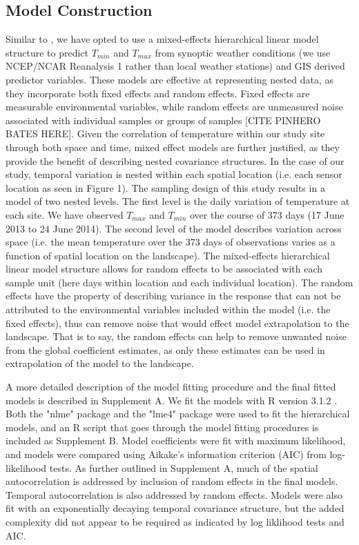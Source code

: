 \documentclass{ametsoc}
\begin{document}
\subsection{Model Construction} 
Similar to \citet{Fridley2009}, we have opted to
use a mixed-effects hierarchical linear model structure to predict $T_{min}$ and
$T_{max}$ from synoptic weather conditions (we use NCEP/NCAR Reanalysis 1 rather 
than local weather stations) and GIS derived predictor variables.
These models are effective at representing nested data, as they incorporate both
fixed effects and random effects. Fixed effects are measurable environmental
variables, while random effects are unmeasured noise associated with individual
samples or groups of samples [CITE PINHERO BATES HERE]. Given the correlation of
temperature within our study site through both space and time, mixed effect
models are further justified, as they provide the benefit of describing nested
covariance structures. In the case of our study, temporal variation is nested
within each spatial location (i.e. each sensor location as seen in Figure 1).
The sampling design of this study results in a model of two nested levels. The
first level is the daily variation of temperature at each site. We have observed
$T_{max}$ and $T_{min}$ over the course of 373 days (17 June 2013 to 24 June
2014). The second level of the model describes variation across space (i.e. the
mean temperature over the 373 days of observations varies as a function of
spatial location on the landscape). The mixed-effects hierarchical linear model
structure allows for random effects to be associated with each sample unit (here
days within location and each individual location). The random effects have the
property of describing variance in the response that can not be attributed to
the environmental variables included within the model (i.e. the fixed effects),
thus can remove noise that would effect model extrapolation to the landscape.
That is to say, the random effects can help to remove unwanted noise from the
global coefficient estimates, as only these estimates can be used in
extrapolation of the model to the landscape.

A more detailed description of the model fitting procedure and the final fitted
models is described in Supplement A. We fit the models with R version 3.1.2
\citep{R2015}. Both the "nlme" \citep{nlme2015} package and the "lme4" \citep{lme42015}
 package were used to fit the
hierarchical models, and an R script that goes through the model fitting
procedures is included as Supplement B. Model coefficients were fit with maximum
likelihood, and models were compared using Aikake's information criterion (AIC)
from log-likelihood tests. As further outlined in Supplement A, much of the
spatial autocorrelation is addressed by inclusion of random effects in the final
models. Temporal autocorrelation is also addressed by random effects. Models
were also fit with an exponentially decaying temporal covariance structure, but
the added complexity did not appear to be required as indicated by log liklihood
tests and AIC.
\end{document}
